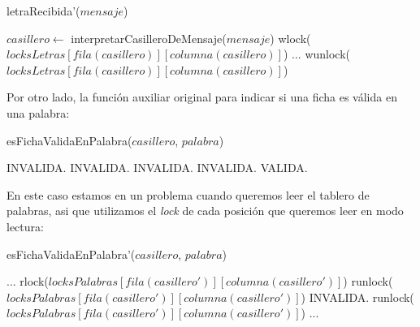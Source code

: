\begin{algorithm}[H]
\caption{letraRecibida'($mensaje$)}
\begin{algorithmic}[1]
    \STATE $casillero \leftarrow$ interpretarCasilleroDeMensaje($mensaje$)
    \STATE wlock($locksLetras[fila(casillero)][columna(casillero)]$)
    \STATE ...
    \STATE wunlock($locksLetras[fila(casillero)][columna(casillero)]$)
\end{algorithmic}
\end{algorithm}

Por otro lado, la función auxiliar original para indicar si una ficha es válida en una palabra:

\begin{algorithm}[H]
\caption{esFichaValidaEnPalabra($casillero$, $palabra$)}
\begin{algorithmic}[1]
        \RETURN INVALIDA.
    \ENDIF
        \RETURN INVALIDA.
    \ENDIF
                    \RETURN INVALIDA.
                \ENDIF
            \ENDFOR
        \ELSE
            \RETURN INVALIDA.
        \ENDIF
    \ENDIF
    \RETURN VALIDA.
\end{algorithmic}
\end{algorithm}

\noindent En este caso estamos en un problema cuando queremos leer el tablero de palabras, asi que utilizamos el \emph{lock} de cada posición que queremos leer en modo lectura:

\begin{algorithm}[H]
\caption{esFichaValidaEnPalabra'($casillero$, $palabra$)}
\begin{algorithmic}[1]
    \STATE ...
        \STATE rlock($locksPalabras[fila(casillero')][columna(casillero')]$)
            \STATE runlock($locksPalabras[fila(casillero')][columna(casillero')]$)
            \RETURN INVALIDA.
        \ENDIF
        \STATE runlock($locksPalabras[fila(casillero')][columna(casillero')]$)
    \ENDFOR
    \STATE ...
\end{algorithmic}
\end{algorithm}

